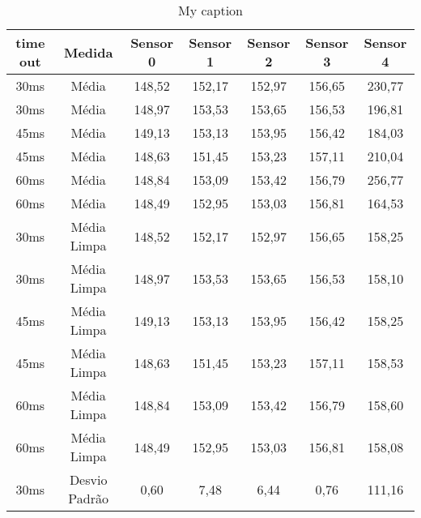\begin{table}[]
\centering
\caption{My caption}
\label{my-label}
\begin{tabular}{|c|c|ccccc|}
\hline
\textbf{time out} & \textbf{Medida}     & \textbf{Sensor 0} & \textbf{Sensor 1} & \textbf{Sensor 2} & \textbf{Sensor 3} & \textbf{Sensor 4} \\ \hline
30ms              & Média               & 148,52            & 152,17            & 152,97            & 156,65            & 230,77            \\
30ms              & Média               & 148,97            & 153,53            & 153,65            & 156,53            & 196,81            \\
45ms              & Média               & 149,13            & 153,13            & 153,95            & 156,42            & 184,03            \\
45ms              & Média               & 148,63            & 151,45            & 153,23            & 157,11            & 210,04            \\
60ms              & Média               & 148,84            & 153,09            & 153,42            & 156,79            & 256,77            \\
60ms              & Média               & 148,49            & 152,95            & 153,03            & 156,81            & 164,53            \\ \hline
30ms              & Média Limpa         & 148,52            & 152,17            & 152,97            & 156,65            & 158,25            \\
30ms              & Média Limpa         & 148,97            & 153,53            & 153,65            & 156,53            & 158,10            \\
45ms              & Média Limpa         & 149,13            & 153,13            & 153,95            & 156,42            & 158,25            \\
45ms              & Média Limpa         & 148,63            & 151,45            & 153,23            & 157,11            & 158,53            \\
60ms              & Média Limpa         & 148,84            & 153,09            & 153,42            & 156,79            & 158,60            \\
60ms              & Média Limpa         & 148,49            & 152,95            & 153,03            & 156,81            & 158,08            \\ \hline
30ms              & Desvio Padrão       & 0,60              & 7,48              & 6,44              & 0,76              & 111,16            \\

\end{tabular}
\end{table}
